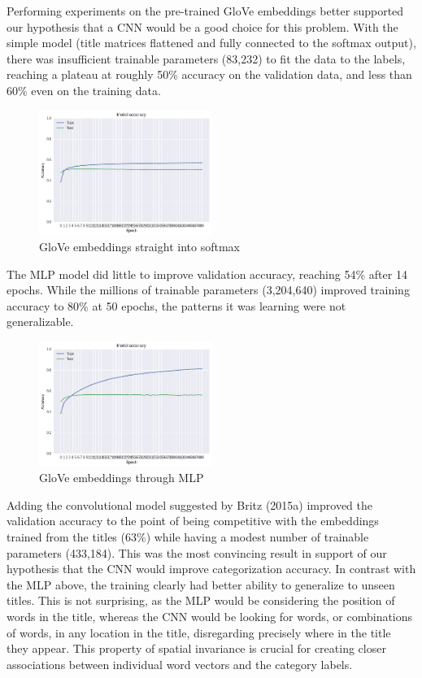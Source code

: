 \documentclass[jou,apacite, 10px]{apa6}
\begin{document}
Performing experiments on the pre-trained GloVe embeddings better supported our hypothesis that a CNN would be a good choice for this problem. With the simple model (title matrices flattened and fully connected to the softmax output), there was insufficient trainable parameters (83,232) to fit the data to the labels, reaching a plateau at roughly 50\% accuracy on the validation data, and less than 60\% even on the training data.\\

\begin{figure}[h!]
    \centering
     \includegraphics[width=0.5\textwidth]{images/Training-Glove}
        \caption{GloVe embeddings straight into softmax}
\end{figure}

The MLP model did little to improve validation accuracy, reaching 54\% after 14 epochs. While the millions of trainable parameters (3,204,640) improved training accuracy to 80\% at 50 epochs, the patterns it was learning were not generalizable.\\

\begin{figure}[h!]
    \centering
     \includegraphics[width=0.5\textwidth]{images/Training-GloveMLP}
        \caption{GloVe embeddings through MLP}
\end{figure}

Adding the convolutional model suggested by Britz (2015a) improved the validation accuracy to the point of being competitive with the embeddings trained from the titles (63\%) while having a modest number of trainable parameters (433,184). This was the most convincing result in support of our hypothesis that the CNN would improve categorization accuracy. In contrast with the MLP above, the training clearly had better ability to generalize to unseen titles. This is not surprising, as the MLP would be considering the position of words in the title, whereas the CNN would be looking for words, or combinations of words, in any location in the title, disregarding precisely where in the title they appear. This property of spatial invariance is crucial for creating closer associations between individual word vectors and the category labels.\\
\end{document}
